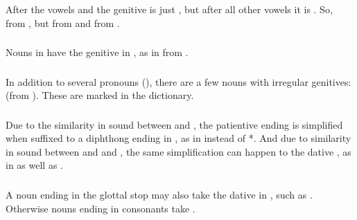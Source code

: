 \subsubsection{} After the vowels  and  the genitive is just
, but after all other vowels it is .  So, 
from , but  from  and 
from .

\subsubsection{} Nouns in  have the genitive in , as in
 from .

\subsubsection{} In addition to several pronouns
(), there are a few nouns with
irregular genitives:  (from ).  These are
marked in the dictionary.

\subsubsection{} Due to the similarity in sound between  and
, the patientive ending  is simplified when suffixed to a
diphthong ending in , as in   instead of
*.  And due to similarity in sound between  and and
, the same simplification can happen to the dative , as in
  as well as .

\subsubsection{} A noun ending in the glottal stop may also take the
dative in , such as .  Otherwise
nouns ending in consonants take .

